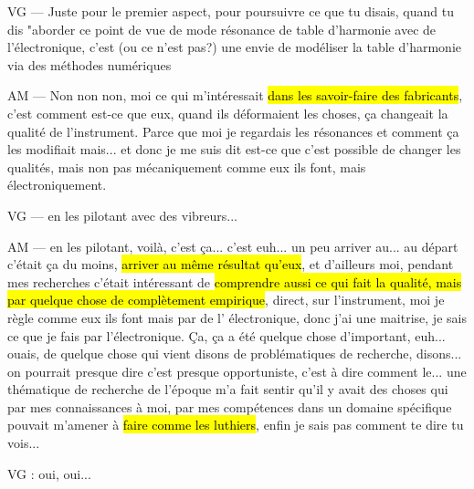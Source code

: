 VG — Juste pour le premier aspect, pour poursuivre ce que tu disais, quand tu dis "aborder ce point de vue de mode résonance de table d'harmonie avec de l'électronique, c'est (ou ce n'est pas?) une envie de modéliser la table d'harmonie via des méthodes numériques

AM — Non non non, moi ce qui m'intéressait \hl{dans les savoir-faire des fabricants}, c'est comment  est-ce que eux, quand ils déformaient les choses, ça changeait la qualité de l'instrument. Parce que moi je regardais les résonances et comment ça les modifiait mais... et donc je me suis dit est-ce que c'est possible de changer les qualités, mais non pas mécaniquement comme eux ils font, mais électroniquement.

VG — en les pilotant avec des vibreurs... 

AM — en les pilotant, voilà, c'est ça... c'est euh... un peu arriver au... au départ c'était ça du moins, \hl{arriver au même résultat qu'eux}, et d'ailleurs moi, pendant mes recherches c'était intéressant de \hl{comprendre aussi ce qui fait la qualité, mais par quelque chose de complètement empirique}, direct, sur l'instrument, moi je règle comme eux ils font mais par de l' électronique, donc j'ai une maitrise, je sais ce que je fais par l'électronique.
Ça, ça a été quelque chose d'important, euh... ouais, de quelque chose qui vient disons de problématiques de recherche, disons... on pourrait presque dire c'est presque opportuniste, c'est à dire comment le... une thématique de recherche de l'époque m'a fait sentir qu'il y avait des choses qui par mes connaissances à moi, par mes compétences dans un domaine spécifique pouvait m'amener à \hl{faire comme les luthiers}, enfin je sais pas comment te dire tu vois... 

VG  : oui, oui... 

